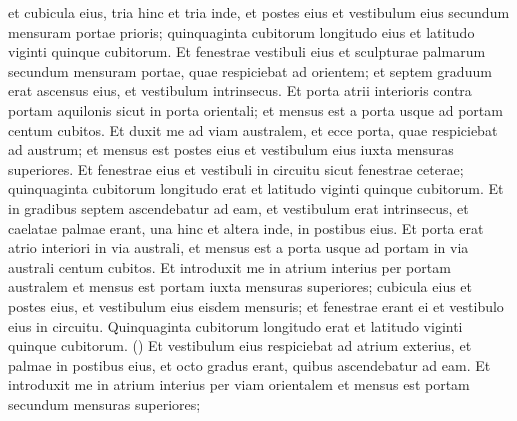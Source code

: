\begin{biblechapter}
\begin{biblechapter}
\begin{biblechapter}
\begin{biblechapter}
\begin{biblechapter}
\begin{biblechapter}
\begin{biblechapter}
\begin{biblechapter}
\begin{biblechapter}
\begin{biblechapter}
\begin{biblechapter}
\begin{biblechapter}
\begin{biblechapter}
\begin{biblechapter}
\begin{biblechapter}
\begin{biblechapter}
\begin{biblechapter}
\begin{biblechapter}
\begin{biblechapter}
\begin{biblechapter}
\begin{biblechapter}
\begin{biblechapter}
\begin{biblechapter}
\begin{biblechapter}
\begin{biblechapter}
\begin{biblechapter}
\begin{biblechapter}
\begin{biblechapter}
\begin{biblechapter}
\begin{biblechapter}
\begin{biblechapter}
\begin{biblechapter}
\begin{biblechapter}
\begin{biblechapter}
\begin{biblechapter}
\begin{biblechapter}
\begin{biblechapter}
\begin{biblechapter}
\begin{biblechapter}
\begin{biblechapter}
\verse et cubicula eius, tria hinc et tria inde, et postes eius et vestibulum eius secundum mensuram portae prioris; quinquaginta cubitorum longitudo eius et latitudo viginti quinque cubitorum. 
 \verse Et fenestrae vestibuli eius et sculpturae palmarum secundum mensuram portae, quae respiciebat ad orientem; et septem graduum erat ascensus eius, et vestibulum intrinsecus. 
\verse Et porta atrii interioris contra portam aquilonis sicut in porta orientali; et mensus est a porta usque ad portam centum cubitos. 
\verse Et duxit me ad viam australem, et ecce porta, quae respiciebat ad austrum; et mensus est postes eius et vestibulum eius iuxta mensuras superiores. 
 \verse Et fenestrae eius et vestibuli in circuitu sicut fenestrae ceterae; quinquaginta cubitorum longitudo erat et latitudo viginti quinque cubitorum. 
 \verse Et in gradibus septem ascendebatur ad eam, et vestibulum erat intrinsecus, et caelatae palmae erant, una hinc et altera inde, in postibus eius. 
\verse Et porta erat atrio interiori in via australi, et mensus est a porta usque ad portam in via australi centum cubitos.
 \verse Et introduxit me in atrium interius per portam australem et mensus est portam iuxta mensuras superiores; 
\verse cubicula eius et postes eius, et vestibulum eius eisdem mensuris; et fenestrae erant ei et vestibulo eius in circuitu. Quinquaginta cubitorum longitudo erat et latitudo viginti quinque cubitorum. 
(\verse) \verse Et vestibulum eius respiciebat ad atrium exterius, et palmae in postibus eius, et octo gradus erant, quibus ascendebatur ad eam.
 \verse Et introduxit me in atrium interius per viam orientalem et mensus est portam secundum mensuras superiores; 

\end{biblechapter}
\end{biblechapter}
\end{biblechapter}
\end{biblechapter}
\end{biblechapter}
\end{biblechapter}
\end{biblechapter}
\end{biblechapter}
\end{biblechapter}
\end{biblechapter}
\end{biblechapter}
\end{biblechapter}
\end{biblechapter}
\end{biblechapter}
\end{biblechapter}
\end{biblechapter}
\end{biblechapter}
\end{biblechapter}
\end{biblechapter}
\end{biblechapter}
\end{biblechapter}
\end{biblechapter}
\end{biblechapter}
\end{biblechapter}
\end{biblechapter}
\end{biblechapter}
\end{biblechapter}
\end{biblechapter}
\end{biblechapter}
\end{biblechapter}
\end{biblechapter}
\end{biblechapter}
\end{biblechapter}
\end{biblechapter}
\end{biblechapter}
\end{biblechapter}
\end{biblechapter}
\end{biblechapter}
\end{biblechapter}
\end{biblechapter}
